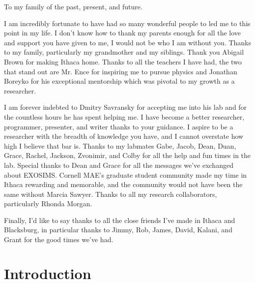 \documentclass[phd,tocprelim]{cornell}
\begin{document}
\begin{dedication}
To my family of the past, present, and future.
\end{dedication}

\begin{acknowledgements}

I am incredibly fortunate to have had so many wonderful people to led me to
this point in my life. I don't know how to thank my parents enough for all the
love and support you have given to me, I would not be who I am without you.
Thanks to my family, particularly my grandmother and my siblings. Thank you
Abigail Brown for making Ithaca home. Thanks to all the teachers I have had,
the two that stand out are Mr. Ence for inspiring me to pursue physics and
Jonathan Boreyko for his exceptional mentorship which was pivotal to my growth
as a researcher.

I am forever indebted to Dmitry Savransky for accepting me into his lab and for
the countless hours he has spent helping me. I have become a better researcher,
programmer, presenter, and writer thanks to your guidance. I aspire to be a
researcher with the breadth of knowledge you have, and I cannot overstate how
high I believe that bar is. Thanks to my labmates Gabe, Jacob, Dean, Duan,
Grace, Rachel, Jackson, Zvonimir, and Colby for all the help and fun times in
the lab. Special thanks to Dean and Grace for all the messages we've exchanged
about EXOSIMS. Cornell MAE's graduate student community made my time in Ithaca
rewarding and memorable, and the community would not have been the same without
Marcia Sawyer. Thanks to all my research collaborators, particularly Rhonda
Morgan.

Finally, I'd like to say thanks to all the close friends I've made in Ithaca
and Blacksburg, in particular thanks to Jimmy, Rob, James, David, Kalani, and
Grant for the good times we've had.


\end{acknowledgements}

\contentspage
\tablelistpage
\figurelistpage

\normalspacing \setcounter{page}{1} 
\pagestyle{cornell} \addtolength{\parskip}{0.5\baselineskip}

\chapter{Introduction}
\label{cha:intro}

\end{document}
